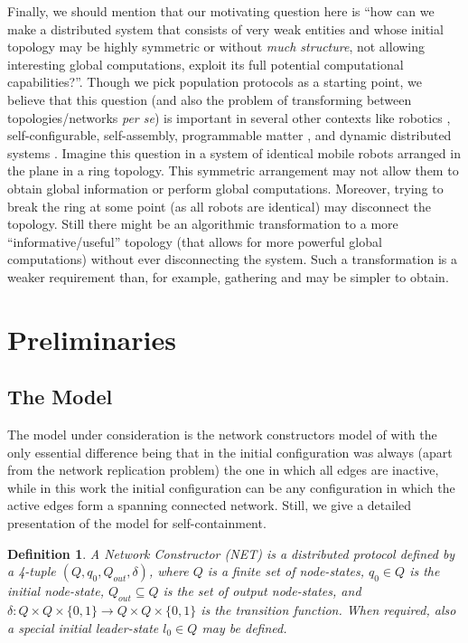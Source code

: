 \documentclass[preprint]{elsarticle}
\newtheorem{definition}{Definition}
\begin{document}
Finally, we should mention that our motivating question here is ``how can we make a distributed system that consists of very weak entities and whose initial topology may be highly symmetric or without \emph{much structure}, not allowing interesting global computations, exploit its full potential computational capabilities?''. Though we pick population protocols as a starting point, we believe that this question (and also the problem of transforming between topologies/networks \emph{per se}) is important in several other contexts like robotics \cite{SY99,DFSY15,CKLL09,FYKY12}, self-configurable, self-assembly, programmable matter \cite{Mi15,DDGRS14}, and dynamic distributed systems \cite{OW05,KLO10,MCS14,MCS13b}. Imagine this question in a system of identical mobile robots arranged in the plane in a ring topology. This symmetric arrangement may not allow them to obtain global information or perform global computations. Moreover, trying to break the ring at some point (as all robots are identical) may disconnect the topology. Still there might be an algorithmic transformation to a more ``informative/useful'' topology (that allows for more powerful global computations) without ever disconnecting the system. Such a transformation is a weaker requirement than, for example, gathering \cite{CFPS03} and may be simpler to obtain.


\section{Preliminaries}
\label{sec:prel}

\subsection{The Model}
\label{subsec:model}

The model under consideration is the network constructors model of \cite{MS14} with the only essential difference being that in \cite{MS14} the initial configuration was always (apart from the network replication problem) the one in which all edges are inactive, while in this work the initial configuration can be any configuration in which the active edges form a spanning connected network. Still, we give a detailed presentation of the model for self-containment.

\begin{definition}
A \emph{Network Constructor} (NET) is a distributed protocol defined by a 4-tuple $(Q,q_0,Q_{out},\delta)$, where
$Q$ is a finite set of \emph{node-states}, $q_0\in Q$ is the \emph{initial node-state}, $Q_{out}\subseteq Q$ is the set of \emph{output node-states}, and $\delta : Q\times Q\times \{0,1\} \rightarrow Q\times Q\times \{0,1\}$ is the \emph{transition function}. When required, also a special \emph{initial leader-state} $l_0\in Q$ may be defined.
\end{definition}
\end{document}
